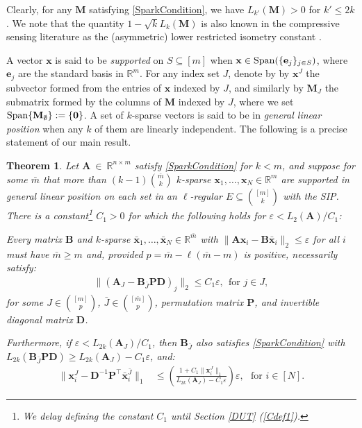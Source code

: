 \documentclass[9pt,twocolumn]{pnas-new}
\newtheorem{theorem}{Theorem}
\begin{document}
Clearly, for any $\mathbf{M}$ satisfying \eqref{SparkCondition}, we have $L_{k'}(\mathbf{M}) > 0$ for  $k' \leq 2k$. We note that the quantity $1 - \sqrt{k} L_k(\mathbf{M})$ is also known in the compressive sensing literature as the (asymmetric) lower restricted isometry constant \cite{Blanchard2011}.
 
A vector $\mathbf{x}$ is said to be \emph{supported} on $S \subseteq [m]$ when $\mathbf{x} \in \text{\rm Span}( \{\mathbf{e}_j\}_{j\in S})$, where $\mathbf{e}_j$ are the standard basis in $\mathbb R^m$. For any index set $J$, denote by by $\mathbf{x}^J$ the subvector formed from the entries of $\mathbf{x}$ indexed by $J$, and similarly by $\mathbf{M}_J$ the submatrix formed by the columns of $\mathbf{M}$ indexed by $J$, where we set $\text{\rm Span}\{\mathbf{M}_\emptyset\} := \{\textbf{0}\}$. A set of $k$-sparse vectors is said to be in \emph{general linear position} when any $k$ of them are linearly independent. The following is a precise statement of our main result.

\begin{theorem}\label{DeterministicUniquenessTheorem}
Let $\mathbf{A}~\in~\mathbb{R}^{n \times m}$ satisfy \eqref{SparkCondition} for $k < m$, and suppose for some $\bar m$ that more than \mbox{$(k-1){\bar m \choose k}$} $k$-sparse \mbox{$\mathbf{x}_1, \ldots, \mathbf{x}_N \in \mathbb{R}^m$} are supported in general linear position on each set in an $\ell$-regular $E \subseteq {[m] \choose k}$ with the SIP.  There is a constant\footnote{We delay defining the constant $C_1$ until Section \ref{DUT} (\eqref{Cdef1}).} $C_1 > 0$ for which the following holds for $\varepsilon < L_2(\mathbf{A}) / C_1$:

Every matrix $\mathbf{B}$ and $k$-sparse $\mathbf{\bar x}_1, \ldots, \mathbf{\bar x}_N \in \mathbb{R}^{\bar m}$ with  \mbox{$\|\mathbf{A}\mathbf{x}_i - \mathbf{B}\mathbf{\bar x}_i\|_2 \leq \varepsilon$} for all $i$ must have $\bar m \geq m$ and, provided $p = \bar m - \ell(\bar m - m)$ is positive, necessarily satisfy:
\begin{align}\label{Cstable}
\|(\mathbf{A}_J- \mathbf{B}_{\bar J} \mathbf{PD} )_j\|_2 \leq C_1 \varepsilon, \ \  \text{for $j \in J$},
\end{align}
for some $J \in {[m] \choose p}$, $\bar J \in {[\bar m] \choose p}$, permutation matrix $\mathbf{P}$, and invertible diagonal matrix $\mathbf{D}$.

Furthermore, if $\varepsilon < L_{2k}(\mathbf{A}_J) / C_1$, then $\mathbf{B}_{\bar J}$ also satisfies \eqref{SparkCondition} with $L_{2k}(\mathbf{B}_{\bar J}\mathbf{PD}) \geq L_{2k}(\mathbf{A}_J) - C_1 \varepsilon$, and:
\begin{align}\label{b-PDa}
\|\mathbf{x}_i^J - \mathbf{D}^{-1}\mathbf{P}^{\top}\mathbf{\bar x}_i^{\bar J}\|_1 &\leq  \left( \frac{ 1+C_1 \|\mathbf{x}_i^{J}\|_1 }{ L_{2k}(\mathbf{A}_J) -  C_1\varepsilon } \right) \varepsilon,\ \ \   \text{for $i \in [N]$}.
\end{align}
\end{theorem}
\end{document}
